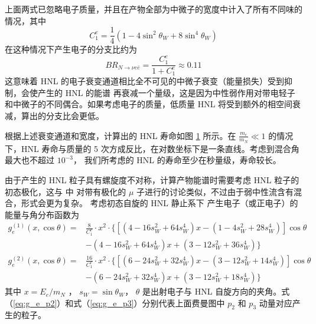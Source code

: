 \documentclass[printMode=false, declarePage=false]{ecnuthesis}
\begin{document}
上面两式已忽略电子质量，并且在产物全部为中微子的宽度中计入了所有不同味的情况，其中
\begin{equation}
  C_1^e = \frac{1}{4}\left(1 - 4 \sin^2 \theta_W + 8 \sin^4 \theta_W\right)
\end{equation}
在这种情况下产生电子的分支比约为
\begin{equation}
  BR_{N \to \nu e \bar{e}} = \frac{C_1^e}{1 + C_1^e} \approx 0.11
\end{equation}
这意味着 HNL 的电子衰变通道相比全不可见的中微子衰变（能量损失）受到抑制，会使产生的 HNL 的能谱
再衰减一个量级，这是因为中性弱作用对带电轻子和中微子的不同偶合。如果考虑电子的质量，低质量 HNL
将受到额外的相空间衰减，算出的分支比会更低。

\begin{figure}[htbp]
  \centering
  
  \vspace{-1.0cm}
  \label{fig:HNL_lifetime}
\end{figure}

根据上述衰变通道和宽度，计算出的 HNL 寿命如图 \ref{fig:HNL_lifetime} 所示。在 $\frac{m_e}{m_N} \ll 1$ 的情况
下，HNL 寿命与质量的 5 次方成反比，在对数坐标下是一条直线。考虑到混合角最大也不超过 $10^{-3}$，
我们所考虑的 HNL 的寿命至少在秒量级，寿命较长。

由于产生的 HNL 粒子具有螺旋度不对称，计算产物能谱时需要考虑 HNL 粒子的初态极化，这与 \cite{kelner2006energy} 中
对带有极化的 $\mu$ 子进行的讨论类似，不过由于弱中性流含有混合，形式会更为复杂。
考虑初态自旋的 HNL 静止系下
产生电子（或正电子）的能量与角分布函数为
\begin{equation}
  \begin{split}
    g_e^{(1)}(x, \cos{\theta}) = & \frac{8}{C_1^e} \cdot x^2 \cdot \{ [(4 - 16 s_W^2 + 64 s_W^4) x - (1 - 4 s_W^2 + 28 s_W^4)] \cos{\theta} \\
                                 & - (4 - 16 s_W^2 + 64 s_W^4) x + (3 - 12 s_W^2 + 36 s_W^4) \} \label{eq:g_e_p2}
  \end{split}
\end{equation}
\begin{equation}
  \begin{split}
    g_e^{(2)}(x, \cos{\theta}) = & \frac{16}{C_1^e} \cdot x^2 \cdot \{ [(6 - 24 s_W^2 + 32 s_W^4) x - (3 - 12 s_W^2 + 14 s_W^4)] \cos{\theta} \\
                                 & - (6 - 24 s_W^2 + 32 s_W^4) x + (3 - 12 s_W^2 + 18 s_W^4) \} \label{eq:g_e_p3}
  \end{split}
\end{equation}
其中 $x = E_e / m_N$ ， $s_W = \sin{\theta_W}$， $\theta$ 是出射电子与 HNL 自旋方向的夹角。式（\ref{eq:g_e_p2}）和式（\ref{eq:g_e_p3}）分别代表上面费曼图中
$p_2$ 和 $p_3$ 动量对应产生的粒子。
\end{document}
